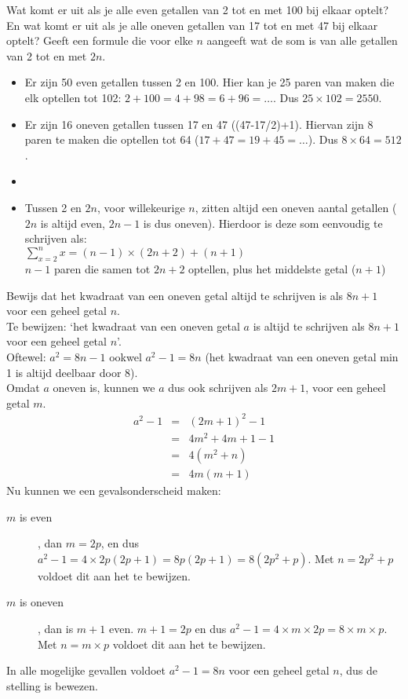 \begin{answer}[Optioneel]
Wat komt er uit als je alle even getallen van 2 tot en met 100 bij elkaar optelt? En wat komt er uit als je alle oneven getallen van 17 tot en met 47 bij elkaar optelt? Geeft een formule die voor elke $n$ aangeeft wat de som is van alle getallen van 2 tot en met $2n$.\\[2.5pt]
\begin{itemize}
  \item Er zijn 50 even getallen tussen 2 en 100. Hier kan je 25 paren van maken die elk optellen tot 102: $2+100 = 4+98 = 6+96 = \ldots$. Dus $25\times 102 = 2550$.
  \item Er zijn 16 oneven getallen tussen 17 en 47 ((47-17/2)+1). Hiervan zijn 8 paren te maken die optellen tot 64 ($17+47=19+45=\ldots$). Dus $8\times 64=512$.
  \item 
  \item Tussen 2 en $2n$, voor willekeurige $n$, zitten altijd een oneven aantal getallen ($2n$ is altijd even, $2n-1$ is dus oneven). Hierdoor is deze som eenvoudig te schrijven als:\\
  $\sum\limits_{x=2}^{n}x=(n-1)\times(2n+2)+(n+1)$\\ $n-1$ paren die samen tot $2n+2$ optellen, plus het middelste getal ($n+1$)
\end{itemize}
\end{answer}

\begin{answer}[Optioneel]
Bewijs dat het kwadraat van een oneven getal altijd te schrijven is als $8n+1$ voor een geheel getal $n$.\\[5pt]

Te bewijzen: `het kwadraat van een oneven getal $a$ is altijd te schrijven als $8n+1$ voor een geheel getal $n$'.\\[3pt]
Oftewel: $a^2=8n-1$ ookwel $a^2-1=8n$ (het kwadraat van een oneven getal min 1 is altijd deelbaar door 8).\\[2.5pt]
Omdat $a$ oneven is, kunnen we $a$ dus ook schrijven als $2m+1$, voor een geheel getal $m$.
\begin{eqnarray*}
a^2-1 & = & (2m+1)^2-1\\
& = & 4m^2+4m+1-1\\
& = & 4(m^2+n)\\
& = & 4m(m+1)
\end{eqnarray*}
Nu kunnen we een gevalsonderscheid maken:
\begin{description}
\item[$m$ is even], dan $m=2p$, en dus $a^2-1=4\times 2p(2p+1)=8p(2p+1)=8(2p^2+p)$. Met $n=2p^2+p$ voldoet dit aan het te bewijzen.
\item[$m$ is oneven], dan is $m+1$ even. $m+1=2p$ en dus $a^2-1=4\times m\times 2p=8\times m\times p$. Met $n=m\times p$ voldoet dit aan het te bewijzen.
\end{description}
In alle mogelijke gevallen voldoet $a^2-1=8n$ voor een geheel getal $n$, dus de stelling is bewezen.
\end{answer}

